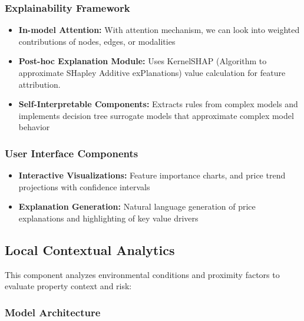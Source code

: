 \subsubsection{Explainability Framework}
\begin{itemize}
    \item \textbf{In-model Attention:} With attention mechanism, we can look into weighted contributions of nodes, edges, or modalities
    \item \textbf{Post-hoc Explanation Module:} Uses KernelSHAP\cite{kernelshap} (Algorithm to approximate SHapley Additive exPlanations) value calculation for feature attribution.
    \item \textbf{Self-Interpretable Components:} Extracts rules from complex models and implements decision tree surrogate models that approximate complex model behavior
\end{itemize}

\subsubsection{User Interface Components}
\begin{itemize}
    \item \textbf{Interactive Visualizations:} Feature importance charts, and price trend projections with confidence intervals
    \item \textbf{Explanation Generation:} Natural language generation of price explanations and highlighting of key value drivers
\end{itemize}

\subsection{Local Contextual Analytics}
This component analyzes environmental conditions and proximity factors to evaluate property context and risk:

\subsubsection{Model Architecture}

